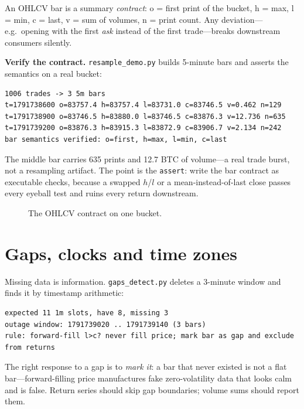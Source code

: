An OHLCV bar is a summary \emph{contract}: o = first print of the bucket, h = max, l = min,
c = last, v = sum of volumes, n = print count. Any deviation---e.g.\ opening with the first
\emph{ask} instead of the first trade---breaks downstream consumers silently.

\begin{example}\label{ex:resample}
\textbf{Verify the contract.} \texttt{resample\_demo.py} builds 5-minute bars and asserts the
semantics on a real bucket:
\begin{lstlisting}[numbers=none]
1006 trades -> 3 5m bars
t=1791738600 o=83757.4 h=83757.4 l=83731.0 c=83746.5 v=0.462 n=129
t=1791738900 o=83746.5 h=83880.0 l=83746.5 c=83876.3 v=12.736 n=635
t=1791739200 o=83876.3 h=83915.3 l=83872.9 c=83906.7 v=2.134 n=242
bar semantics verified: o=first, h=max, l=min, c=last
\end{lstlisting}
\begin{solution}
The middle bar carries 635 prints and 12.7 BTC of volume---a real trade burst, not a
resampling artifact. The point is the \texttt{assert}: write the bar contract as executable
checks, because a swapped $h$/$l$ or a mean-instead-of-last close passes every eyeball test
and ruins every return downstream.
\end{solution}
\end{example}

\begin{figure}[htbp]\centering

\caption{The OHLCV contract on one bucket.}
\label{fig:resample}
\end{figure}

\section{Gaps, clocks and time zones}\label{sec:gaps}

Missing data is information. \texttt{gaps\_detect.py} deletes a 3-minute window and finds it
by timestamp arithmetic:
\begin{lstlisting}[numbers=none]
expected 11 1m slots, have 8, missing 3
outage window: 1791739020 .. 1791739140 (3 bars)
rule: forward-fill l>c? never fill price; mark bar as gap and exclude from returns
\end{lstlisting}
The right response to a gap is to \emph{mark it}: a bar that never existed is not a flat
bar---forward-filling price manufactures fake zero-volatility data that looks calm and is
false. Return series should skip gap boundaries; volume sums should report them.


